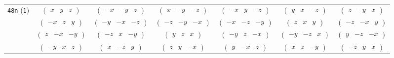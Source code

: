\documentclass[fleqn,9pt,landscape]{jsarticle}
\begin{document}
\begin{center}
\begin{longtable}{ccccccc}
{\tt 48n} ({\tt 1}) & $ \begin{pmatrix} x & y & z \end{pmatrix} $ & $ \begin{pmatrix} - x & - y & z \end{pmatrix} $ & $ \begin{pmatrix} x & - y & - z \end{pmatrix} $ & $ \begin{pmatrix} - x & y & - z \end{pmatrix} $ & $ \begin{pmatrix} y & x & - z \end{pmatrix} $ & $ \begin{pmatrix} z & - y & x \end{pmatrix} $ \\
& $ \begin{pmatrix} - x & z & y \end{pmatrix} $ & $ \begin{pmatrix} - y & - x & - z \end{pmatrix} $ & $ \begin{pmatrix} - z & - y & - x \end{pmatrix} $ & $ \begin{pmatrix} - x & - z & - y \end{pmatrix} $ & $ \begin{pmatrix} z & x & y \end{pmatrix} $ & $ \begin{pmatrix} - z & - x & y \end{pmatrix} $ \\
& $ \begin{pmatrix} z & - x & - y \end{pmatrix} $ & $ \begin{pmatrix} - z & x & - y \end{pmatrix} $ & $ \begin{pmatrix} y & z & x \end{pmatrix} $ & $ \begin{pmatrix} - y & z & - x \end{pmatrix} $ & $ \begin{pmatrix} - y & - z & x \end{pmatrix} $ & $ \begin{pmatrix} y & - z & - x \end{pmatrix} $ \\
& $ \begin{pmatrix} - y & x & z \end{pmatrix} $ & $ \begin{pmatrix} x & - z & y \end{pmatrix} $ & $ \begin{pmatrix} z & y & - x \end{pmatrix} $ & $ \begin{pmatrix} y & - x & z \end{pmatrix} $ & $ \begin{pmatrix} x & z & - y \end{pmatrix} $ & $ \begin{pmatrix} - z & y & x \end{pmatrix} $ \\

\end{longtable}
\end{center}
\end{document}
